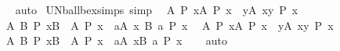 \begin{isabellebody}
%
\isadelimproof
\ \ %
\endisadelimproof
%
\isatagproof
{}\isamarkupfalse%
\ auto%
\endisatagproof
{\isafoldproof}%
%
\isadelimproof
\isanewline
%
\endisadelimproof
\isanewline
{}\isamarkupfalse%
\ UN{\isacharunderscore}{\kern0pt}ball{\isacharunderscore}{\kern0pt}bex{\isacharunderscore}{\kern0pt}simps\ {\isacharbrackleft}{\kern0pt}simp{\isacharbrackright}{\kern0pt}{\isacharcolon}{\kern0pt}\isanewline
\ \ {\isachardoublequoteopen}{\isasymAnd}A\ P{\isachardot}{\kern0pt}\ {\isacharparenleft}{\kern0pt}{\isasymforall}x{\isasymin}{\isasymUnion}A{\isachardot}{\kern0pt}\ P\ x{\isacharparenright}{\kern0pt}\ {\isasymlongleftrightarrow}\ {\isacharparenleft}{\kern0pt}{\isasymforall}y{\isasymin}A{\isachardot}{\kern0pt}\ {\isasymforall}x{\isasymin}y{\isachardot}{\kern0pt}\ P\ x{\isacharparenright}{\kern0pt}{\isachardoublequoteclose}\isanewline
\ \ {\isachardoublequoteopen}{\isasymAnd}A\ B\ P{\isachardot}{\kern0pt}\ {\isacharparenleft}{\kern0pt}{\isasymforall}x{\isasymin}{\isacharparenleft}{\kern0pt}{\isasymUnion}{\isacharparenleft}{\kern0pt}B\ {\isacharbackquote}{\kern0pt}\ A{\isacharparenright}{\kern0pt}{\isacharparenright}{\kern0pt}{\isachardot}{\kern0pt}\ P\ x{\isacharparenright}{\kern0pt}\ {\isacharequal}{\kern0pt}\ {\isacharparenleft}{\kern0pt}{\isasymforall}a{\isasymin}A{\isachardot}{\kern0pt}\ {\isasymforall}x{\isasymin}\ B\ a{\isachardot}{\kern0pt}\ P\ x{\isacharparenright}{\kern0pt}{\isachardoublequoteclose}\isanewline
\ \ {\isachardoublequoteopen}{\isasymAnd}A\ P{\isachardot}{\kern0pt}\ {\isacharparenleft}{\kern0pt}{\isasymexists}x{\isasymin}{\isasymUnion}A{\isachardot}{\kern0pt}\ P\ x{\isacharparenright}{\kern0pt}\ {\isasymlongleftrightarrow}\ {\isacharparenleft}{\kern0pt}{\isasymexists}y{\isasymin}A{\isachardot}{\kern0pt}\ {\isasymexists}x{\isasymin}y{\isachardot}{\kern0pt}\ P\ x{\isacharparenright}{\kern0pt}{\isachardoublequoteclose}\isanewline
\ \ {\isachardoublequoteopen}{\isasymAnd}A\ B\ P{\isachardot}{\kern0pt}\ {\isacharparenleft}{\kern0pt}{\isasymexists}x{\isasymin}{\isacharparenleft}{\kern0pt}{\isasymUnion}{\isacharparenleft}{\kern0pt}B\ {\isacharbackquote}{\kern0pt}\ A{\isacharparenright}{\kern0pt}{\isacharparenright}{\kern0pt}{\isachardot}{\kern0pt}\ P\ x{\isacharparenright}{\kern0pt}\ {\isasymlongleftrightarrow}\ {\isacharparenleft}{\kern0pt}{\isasymexists}a{\isasymin}A{\isachardot}{\kern0pt}\ {\isasymexists}x{\isasymin}B\ a{\isachardot}{\kern0pt}\ P\ x{\isacharparenright}{\kern0pt}{\isachardoublequoteclose}\isanewline
%
\isadelimproof
\ \ %
\endisadelimproof
%
\isatagproof
{}\isamarkupfalse%
\ auto%
\endisatagproof

\end{isabellebody}
